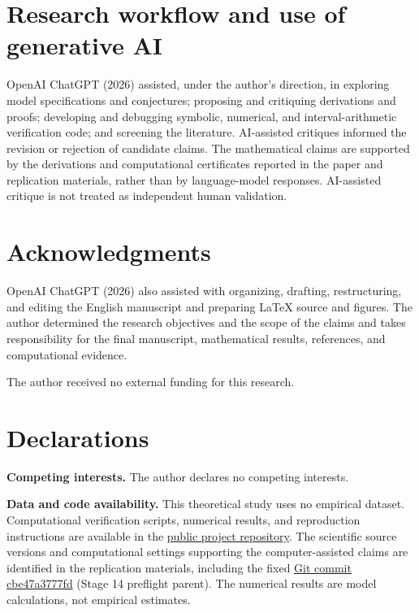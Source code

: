 \documentclass[11pt,a4paper]{article}
\theoremstyle{remark}\newtheorem{remark}[theorem]{Remark}
\begin{document}
\section*{Research workflow and use of generative AI}
OpenAI ChatGPT (2026) assisted, under the author's direction, in exploring model specifications and conjectures; proposing and critiquing derivations and proofs; developing and debugging symbolic, numerical, and interval-arithmetic verification code; and screening the literature. AI-assisted critiques informed the revision or rejection of candidate claims. The mathematical claims are supported by the derivations and computational certificates reported in the paper and replication materials, rather than by language-model responses. AI-assisted critique is not treated as independent human validation.

\section*{Acknowledgments}
OpenAI ChatGPT (2026) also assisted with organizing, drafting, restructuring, and editing the English manuscript and preparing LaTeX source and figures. The author determined the research objectives and the scope of the claims and takes responsibility for the final manuscript, mathematical results, references, and computational evidence.

The author received no external funding for this research.

\section*{Declarations}
\noindent\textbf{Competing interests.} The author declares no competing interests.

\noindent\textbf{Data and code availability.} This theoretical study uses no empirical dataset. Computational verification scripts, numerical results, and reproduction instructions are available in the \href{https://github.com/ryotamatsuki/standards-coalitions-differentiation-cournot}{public project repository}. The scientific source versions and computational settings supporting the computer-assisted claims are identified in the replication materials, including the fixed \href{https://github.com/ryotamatsuki/standards-coalitions-differentiation-cournot/tree/cbe47a3777fdd193289eff0583f9d5d8d16e43d1}{Git commit cbe47a3777fd} (Stage 14 preflight parent). The numerical results are model calculations, not empirical estimates.
\end{document}
